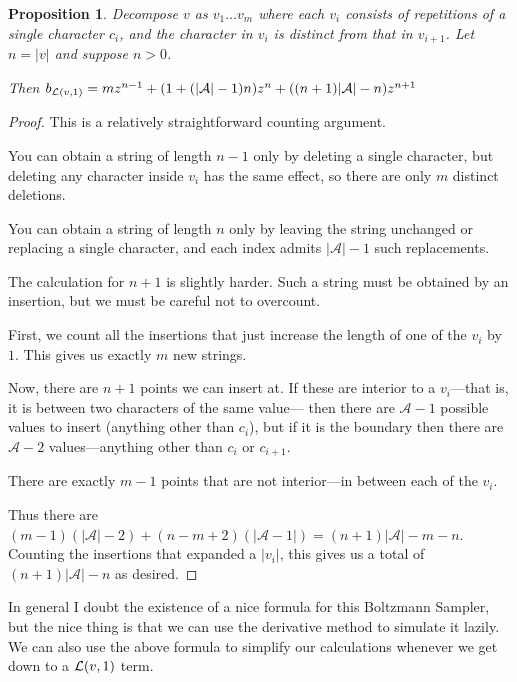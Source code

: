 \documentclass[a4paper]{book}
\newtheorem{proposition}{Proposition}
\begin{document}
\begin{proposition}
Decompose \(v\) as \(v_1 \ldots v_m\) where each \(v_i\) consists of repetitions of a single character \(c_i\),
and the character in \(v_i\) is distinct from that in \(v_{i + 1}\).
Let \(n = |v|\) and suppose \(n > 0\).

Then \(b_{\mathcal{L} (v, 1)} = m z^{n - 1} + (1 + (|\mathcal{A}| - 1)n) z^{n} + ((n + 1) |\mathcal{A}| - n) z^{n + 1}\)
\end{proposition}

\begin{proof}
This is a relatively straightforward counting argument.

You can obtain a string of length \(n - 1\) only by deleting a single character,
but deleting any character inside \(v_i\) has the same effect,
so there are only \(m\) distinct deletions.

You can obtain a string of length \(n\) only by leaving the string unchanged or replacing a single character,
and each index admits \(|\mathcal{A}| - 1\) such replacements.

The calculation for \(n + 1\) is slightly harder.
Such a string must be obtained by an insertion,
but we must be careful not to overcount.

First,
we count all the insertions that just increase the length of one of the \(v_i\) by \(1\).
This gives us exactly \(m\) new strings.

Now, there are \(n + 1\) points we can insert at.
If these are interior to a \(v_i\)---that is,
it is between two characters of the same value---
then there are \(\mathcal{A} - 1\) possible values to insert (anything other than \(c_i\)),
but if it is the boundary then there are  \(\mathcal{A} - 2\) values---anything
other than \(c_i\) or \(c_{i + 1}\).

There are exactly \(m - 1\) points that are not interior---in
between each of the \(v_i\).

Thus there are \((m - 1)(|\mathcal{A}| - 2) + (n - m + 2)(|\mathcal{A} - 1|) = (n + 1) |\mathcal{A}| - m - n\).
Counting the insertions that expanded a \(|v_i|\),
this gives us a total of \((n + 1) |\mathcal{A}| - n\) as desired.
\end{proof}

In general I doubt the existence of a nice formula for this Boltzmann Sampler,
but the nice thing is that we can use the derivative method to simulate it lazily.
We can also use the above formula to simplify our calculations whenever we get down to a \(\mathcal{L} (v, 1)\) term.
\end{document}
